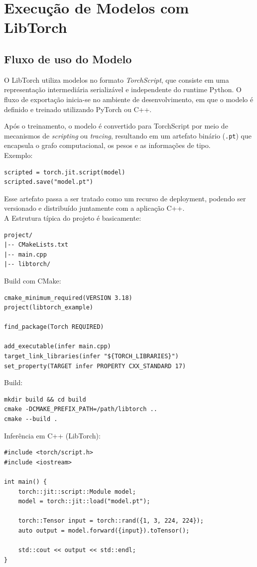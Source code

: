 \section{Execução de Modelos com LibTorch}

\subsection{Fluxo de uso do Modelo}

O LibTorch utiliza modelos no formato \textit{TorchScript}, que consiste em uma
representação intermediária serializável e independente do runtime Python.
O fluxo de exportação inicia-se no ambiente de desenvolvimento, em que o modelo é
definido e treinado utilizando PyTorch ou C++.

Após o treinamento, o modelo é convertido para TorchScript por meio de mecanismos
de \textit{scripting} ou \textit{tracing}, resultando em um artefato binário
(\texttt{.pt}) que encapsula o grafo computacional, os pesos e as informações de tipo.\\

Exemplo:
\begin{verbatim}
scripted = torch.jit.script(model)
scripted.save("model.pt")
\end{verbatim}


Esse artefato passa a ser tratado como um recurso de deployment, podendo ser versionado
e distribuído juntamente com a aplicação C++. \\
A Estrutura típica do projeto é basicamente:

\begin{verbatim}
project/
|-- CMakeLists.txt
|-- main.cpp
|-- libtorch/
\end{verbatim}

Build com CMake:
\begin{verbatim}
cmake_minimum_required(VERSION 3.18)
project(libtorch_example)

find_package(Torch REQUIRED)

add_executable(infer main.cpp)
target_link_libraries(infer "${TORCH_LIBRARIES}")
set_property(TARGET infer PROPERTY CXX_STANDARD 17)
\end{verbatim}

Build:
\begin{verbatim}
mkdir build && cd build
cmake -DCMAKE_PREFIX_PATH=/path/libtorch ..
cmake --build .
\end{verbatim}

Inferência em C++ (LibTorch):
\begin{verbatim}
#include <torch/script.h>
#include <iostream>

int main() {
    torch::jit::script::Module model;
    model = torch::jit::load("model.pt");

    torch::Tensor input = torch::rand({1, 3, 224, 224});
    auto output = model.forward({input}).toTensor();

    std::cout << output << std::endl;
}
\end{verbatim}

